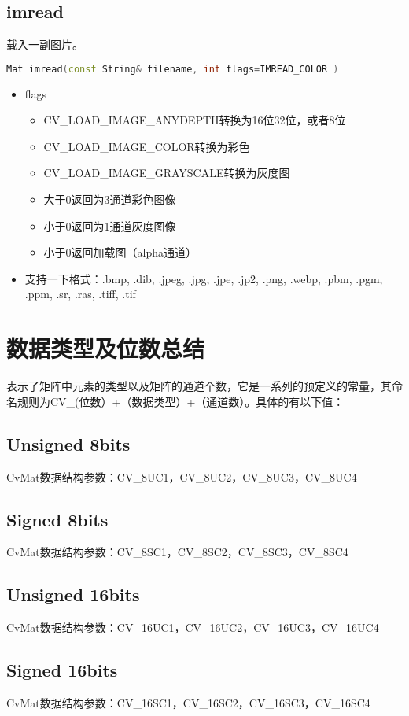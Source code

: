 \documentclass[12pt]{article}
\begin{document}
\subsection{imread}
载入一副图片。
\begin{lstlisting}[language=c++]
Mat imread(const String& filename, int flags=IMREAD_COLOR )
\end{lstlisting}
\begin{itemize}
\item flags
	\begin{itemize}
	\item CV\_LOAD\_IMAGE\_ANYDEPTH转换为16位32位，或者8位
	\item CV\_LOAD\_IMAGE\_COLOR转换为彩色
	\item CV\_LOAD\_IMAGE\_GRAYSCALE转换为灰度图
	\item 大于0返回为3通道彩色图像
	\item 小于0返回为1通道灰度图像
	\item 小于0返回加载图（alpha通道）
	\end{itemize}
\item 支持一下格式：.bmp, .dib, .jpeg, .jpg, .jpe, .jp2, .png, .webp, .pbm, .pgm, .ppm, .sr, .ras, .tiff, .tif
\end{itemize}




\section{数据类型及位数总结}
表示了矩阵中元素的类型以及矩阵的通道个数，它是一系列的预定义的常量，其命名规则为CV\_(位数）+（数据类型）+（通道数）。具体的有以下值：
\subsection{Unsigned 8bits}
CvMat数据结构参数：CV\_8UC1，CV\_8UC2，CV\_8UC3，CV\_8UC4

\subsection{Signed 8bits}
CvMat数据结构参数：CV\_8SC1，CV\_8SC2，CV\_8SC3，CV\_8SC4

\subsection{Unsigned 16bits}
CvMat数据结构参数：CV\_16UC1，CV\_16UC2，CV\_16UC3，CV\_16UC4

\subsection{Signed 16bits}
CvMat数据结构参数：CV\_16SC1，CV\_16SC2，CV\_16SC3，CV\_16SC4
\end{document}
